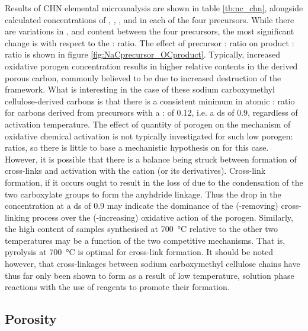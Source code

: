 Results of CHN elemental microanalysis are shown in table \ref{tb:nc_chn}, alongside calculated concentrations of , , , and  in each of the four precursors. While there are variations in ,  and  content between the four precursors, the most significant change is with respect to the : ratio. The effect of precursor : ratio on product : ratio is shown in figure \ref{fig:NaCprecursor_OCproduct}. Typically, increased oxidative \gls{porogen} concentration results in higher relative  contents in the derived porous carbon, commonly believed to be due to increased destruction of the  framework.\citep{park2002effect, chen2020insight, tseng2007physical} What is interesting in the case of these sodium carboxymethyl cellulose-derived carbons is that there is a consistent minimum in atomic : ratio for carbons derived from precursors with a : of 0.12, i.e. a \acrshort{ds} of 0.9, regardless of activation temperature. The effect of quantity of \gls{porogen} on the mechanism of oxidative chemical activation is not typically investigated for such low \gls{porogen}: ratios, so there is little to base a mechanistic hypothesis on for this case. However, it is possible that there is a balance being struck between formation of cross-links and activation with the  cation (or its derivatives). Cross-link formation, if it occurs ought to result in the loss of  due to the condensation of the two carboxylate groups to form the anyhdride linkage. Thus the drop in the  concentration at a \acrshort{ds} of 0.9 may indicate the dominance of the (-removing) cross-linking process over the (-increasing) oxidative action of the \gls{porogen}. Similarly, the high  content of samples synthesised at \qty{700}{\degreeCelsius} relative to the other two temperatures may be a function of the two competitive mechanisms. That is, pyrolysis at \qty{700}{\degreeCelsius} is optimal for cross-link formation. It should be noted however, that cross-linkages between sodium carboxymethyl cellulose chains have thus far only been shown to form as a result of low temperature, solution phase reactions with the use of reagents to promote their formation.\citep{lin2015preparation, yu2017koh, yu2017one}

\subsection{Porosity}

